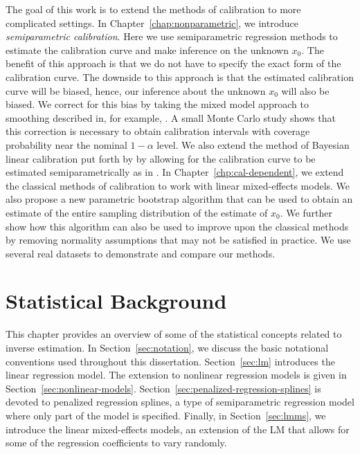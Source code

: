\documentclass[cmfont,usenames,dvipsnames,leqno]{afit-etd}\usepackage[]{graphicx}\usepackage[]{color}
\begin{document}
The goal of this work is to extend the methods of calibration to more complicated settings. In Chapter~\ref{chap:nonparametric}, we introduce \textit{semiparametric calibration}. Here we use semiparametric regression methods to estimate the calibration curve and make inference on the unknown $x_0$. The benefit of this approach is that we do not have to specify the exact form of the calibration curve. The downside to this approach is that the estimated calibration curve will be biased, hence, our inference about the unknown $x_0$ will also be biased. We correct for this bias by taking the mixed model approach to smoothing described in, for example, \citet{ruppert_semiparametric_2003}. A small Monte Carlo study shows that this correction is necessary to obtain calibration intervals with coverage probability near the nominal $1-\alpha$ level. We also extend the method of Bayesian linear calibration put forth by \citet{hoadley_bayesian_1970} by allowing for the calibration curve to be estimated semiparametrically as in \citet{crainiceanu_bayesian_2005}. In Chapter~\ref{chp:cal-dependent}, we extend the classical methods of calibration to work with linear mixed-effects models. We also propose a new parametric bootstrap algorithm that can be used to obtain an estimate of the entire sampling distribution of the estimate of $x_0$. We further show how this algorithm can also be used to improve upon the classical methods by removing normality assumptions that may not be satisfied in practice. We use several real datasets to demonstrate and compare our methods.





\chapter{Statistical Background}
\label{chp:background}
This chapter provides an overview of some of the statistical concepts related to inverse estimation. In Section~\ref{sec:notation}, we discuss the basic notational conventions used throughout this dissertation. Section~\ref{sec:lm} introduces the linear regression model. The extension to nonlinear regression models is given in Section~\ref{sec:nonlinear-models}. Section~\ref{sec:penalized-regression-splines} is devoted to penalized regression splines, a type of semiparametric regression model where only part of the model is specified. Finally, in Section~\ref{sec:lmms}, we introduce the linear mixed-effects models, an extension of the \ac{LM} that allows for some of the regression coefficients to vary randomly. 
\end{document}
